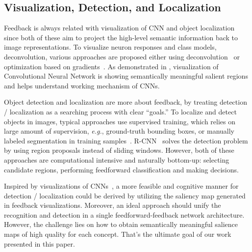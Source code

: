 \subsection{Visualization, Detection, and Localization}

Feedback is always related with visualization of CNN and object localization since both of these aim to project the high-level semantic information back to image representations. To visualize neuron responses and class models, deconvolution, various approaches are proposed either using deconvolution~\cite{zeiler2014visualizing} or optimization based on gradients~\cite{simonyan2013deep}. As demonstrated in \cite{simonyan2013deep}, visualization of Convolutional Neural Network is showing semantically meaningful salient regions and helps understand working mechanism of CNNs.

Object detection and localization are more about feedback, by treating detection / localization as a searching process with clear ``goals.'' To localize and detect objects in images, typical approaches use supervised training, which relies on large amount of supervision, \emph{e.g.}, ground-truth bounding boxes, or manually labeled segmentation in training samples~\cite{erhan2014scalable}. R-CNN~\cite{girshick2014rich} solves the detection problem by using region proposals instead of sliding windows. However, both of these approaches are computational intensive and naturally bottom-up: selecting candidate regions, performing feedforward classification and making decisions.

Inspired by visualizations of CNNs~\cite{zeiler2014visualizing,simonyan2013deep}, a more feasible and cognitive manner for detection / localization could be derived by utilizing the saliency map generated in feedback visualizations. Moreover, an ideal approach should unify the recognition and detection in a single feedforward-feedback network architecture. However, the challenge lies on how to obtain semantically meaningful salience maps of high quality for each concept. That's the ultimate goal of our work presented in this paper.
